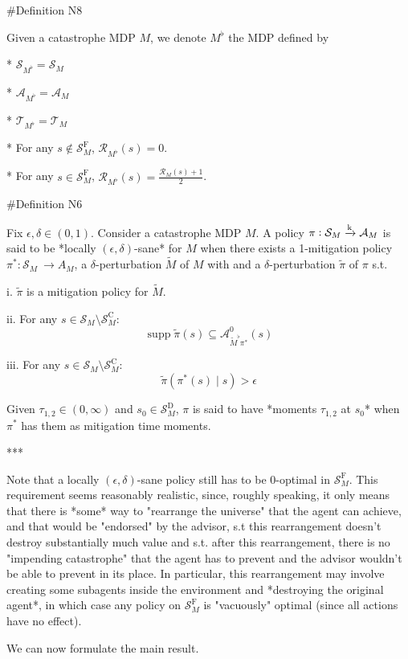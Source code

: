 \documentclass[a4paper]{article}
\DeclareMathOperator{\Supp}{supp}
\newcommand{\AP}[1]{\left(#1\right)}
\newcommand{\M}{\xrightarrow{\textnormal{k}}}
\newcommand{\A}{\mathcal{A}}
\newcommand{\St}{\mathcal{S}}
\newcommand{\T}{\mathcal{T}}
\newcommand{\R}{\mathcal{R}}
\newcommand{\RMC}{\mathrm{C}}
\newcommand{\RMD}{\mathrm{D}}
\newcommand{\RMF}{\mathrm{F}}
\newcommand{\SF}{\St^{\RMF}}
\newcommand{\SD}{\St^{\RMD}}
\newcommand{\SC}{\St^{\RMC}}
\begin{document}
\#Definition N8

Given a catastrophe MDP $M$, we denote $M^\flat$ the MDP defined by

* $\St_{M^\flat} = \St_M$

* $\A_{M^\flat} = \A_M$

* $\T_{M^\flat} = \T_M$

* For any $s\not\in\SF_M$, $\R_{M^\flat}(s) = 0$.

* For any $s \in \SF_M$, $\R_{M^\flat}(s) = \frac{\R_M(s)+1}{2}$.

\#Definition N6

Fix $\epsilon,\delta \in (0,1)$. Consider a catastrophe MDP $M$. A policy $\pi: \St_M \M \A_M$ is said to be *locally $(\epsilon,\delta)$-sane* for $M$ when there exists a 1-mitigation policy $\pi^*: \St_M\ \rightarrow A_M$, a $\delta$-perturbation $\tilde{M}$ of $M$ with and a $\delta$-perturbation $\tilde{\pi}$ of $\pi$ s.t.

i. $\tilde{\pi}$ is a mitigation policy for $\tilde{M}$.

ii. For any $s \in \St_M \setminus \SC_M$: $$\Supp{\tilde{\pi}(s)} \subseteq \A_{\tilde{M}^\flat\pi^*}^0(s)$$

iii. For any $s \in \St_M \setminus \SC_M$: $$\tilde{\pi}\AP{\pi^*(s) \mid s} > \epsilon$$


Given $\tau_{1,2} \in (0,\infty)$ and $s_0 \in \SD_M$, $\pi$ is said to have *moments $\tau_{1,2}$ at $s_0$* when $\pi^*$ has them as mitigation time moments.

***

Note that a locally $(\epsilon,\delta)$-sane policy still has to be $0$-optimal in $\SF_M$. This requirement seems reasonably realistic, since, roughly speaking, it only means that there is *some* way to "rearrange the universe" that the agent can achieve, and that would be "endorsed" by the advisor, s.t this rearrangement doesn't destroy substantially much value and s.t. after this rearrangement, there is no "impending catastrophe" that the agent has to prevent and the advisor wouldn't be able to prevent in its place. In particular, this rearrangement may involve creating some subagents inside the environment and *destroying the original agent*, in which case any policy on $\SF_M$ is "vacuously" optimal (since all actions have no effect).

We can now formulate the main result.
\end{document}

